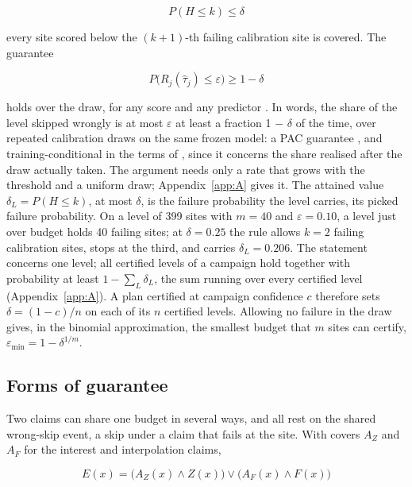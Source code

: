 \documentclass{iopjournal}
\begin{document}
\[
P(H \le k) \le \delta
\]

every site scored below the \((k+1)\)-th failing calibration site is covered. The guarantee

\[
P\big(R_j(\hat\tau_j) \le \varepsilon\big) \ge 1 - \delta
\]

holds over the draw, for any score and any predictor \cite{Wilks1941,Bates2021,Angelopoulos2025}. In words, the share of the level skipped wrongly is at most \ensuremath{\varepsilon} at least a fraction 1 \ensuremath{-} \ensuremath{\delta} of the time, over repeated calibration draws on the same frozen model: a PAC guarantee \cite{Valiant1984,Park2020}, and training-conditional in the terms of \cite{VovkCond2013}, since it concerns the share realised after the draw actually taken. The argument needs only a rate that grows with the threshold and a uniform draw; Appendix~\ref{app:A} gives it. The attained value \(\delta_L = P(H \le k)\), at most \(\delta\), is the failure probability the level carries, its picked failure probability. On a level of 399 sites with \(m = 40\) and \(\varepsilon = 0.10\), a level just over budget holds 40 failing sites; at \(\delta = 0.25\) the rule allows \(k = 2\) failing calibration sites, stops at the third, and carries \(\delta_L = 0.206\). The statement concerns one level; all certified levels of a campaign hold together with probability at least \(1 - \sum_L \delta_L\), the sum running over every certified level (Appendix~\ref{app:A}). A plan certified at campaign confidence \(c\) therefore sets \(\delta = (1 - c)/n\) on each of its \(n\) certified levels. Allowing no failure in the draw gives, in the binomial approximation, the smallest budget that \(m\) sites can certify, \(\varepsilon_{\min} = 1 - \delta^{1/m}\).

\hypertarget{sec:3-4}{%
\subsection{Forms of guarantee}\label{sec:3-4}}

Two claims can share one budget in several ways, and all rest on the shared wrong-skip event, a skip under a claim that fails at the site. With covers \(A_Z\) and \(A_F\) for the interest and interpolation claims,

\[
E(x) = \big(A_Z(x) \wedge Z(x)\big) \vee \big(A_F(x) \wedge F(x)\big)
\]
\end{document}
